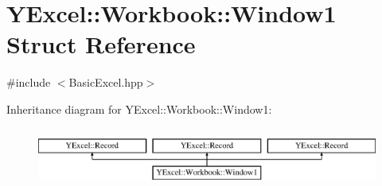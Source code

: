 \hypertarget{struct_y_excel_1_1_workbook_1_1_window1}{}\section{Y\+Excel\+:\+:Workbook\+:\+:Window1 Struct Reference}
\label{struct_y_excel_1_1_workbook_1_1_window1}


{\ttfamily \#include $<$Basic\+Excel.\+hpp$>$}

Inheritance diagram for Y\+Excel\+:\+:Workbook\+:\+:Window1\+:\begin{figure}[H]
\begin{center}
\leavevmode
\includegraphics[height=2.000000cm]{struct_y_excel_1_1_workbook_1_1_window1}
\end{center}
\end{figure}
